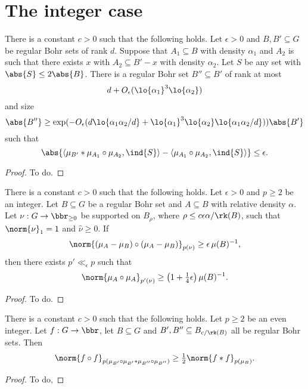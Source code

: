 \chapter{The integer case}

\begin{theorem}
\label{th-ap-int}
There is a constant $c>0$ such that the following holds. Let $\epsilon>0$ and $B,B'\subseteq G$ be regular Bohr sets of rank $d$. Suppose that $A_1\subseteq B$ with density $\alpha_1$ and $A_2$ is such that there exists $x$ with $A_2\subseteq B'-x$ with density $\alpha_2$. Let $S$ be any set with $\abs{S}\leq 2\abs{B}$. There is a regular Bohr set $B''\subseteq B'$ of rank at most
\[d+O_\epsilon(\lo{\alpha_1}^3\lo{\alpha_2})\]
and size
\[\abs{B''}\geq \exp(-O_\epsilon(d\lo{\alpha_1\alpha_2/d}+\lo{\alpha_1}^3\lo{\alpha_2}\lo{\alpha_1\alpha_2/d}))\abs{B'}\]
such that
\[\abs{\langle \mu_{B'}\ast \mu_{A_1}\circ \mu_{A_2},\ind{S}\rangle-\langle \mu_{A_1}\circ \mu_{A_2},\ind{S}\rangle}\leq \epsilon.\]
\end{theorem}
\begin{proof}
To do.
\end{proof}

\begin{proposition}
\label{Lp-orth}
There is a constant $c>0$ such that the following holds. Let $\epsilon >0$ and $p \geq 2$ be an integer. Let $B \subseteq G$ be a regular Bohr set and $A\subseteq B$ with relative density $\alpha$. Let $\nu : G \to \bbr_{\geq 0}$ be supported on $B_\rho$, where $\rho \leq c\epsilon\alpha/\rk(B)$, such that $\norm{\nu}_1=1$ and $\widehat{\nu}\geq 0$. If
    \[ \norm{(\mu_A-\mu_B) \circ (\mu_{A}-\mu_B)}_{p(\nu)} \geq \epsilon\, \mu(B)^{-1}, \]
    then there exists $p'\ll_\epsilon p$ such that
    \[ \norm{ \mu_{A}\circ \mu_{A}}_{p'(\nu)} \geq \left(1+\tfrac{1}{4}\epsilon\right) \mu(B)^{-1}. \]
\end{proposition}
\begin{proof}
To do.
\end{proof}


\begin{proposition}
\label{pos-def-measures}
There is a constant $c>0$ such that the following holds. Let $p \geq 2$ be an even integer. Let $f : G \to \bbr$, let $B \subseteq G$ and $B', B'' \subseteq B_{c/\rk(B)}$ all be regular Bohr sets. Then
\[ \norm{ f\circ f }_{p(\mu_{B'}\circ \mu_{B'}\ast \mu_{B''}\circ \mu_{B''})} \geq \tfrac{1}{2} \norm{f*f}_{p(\mu_B)}. \]
\end{proposition}
\begin{proof}
To do,
\end{proof}

